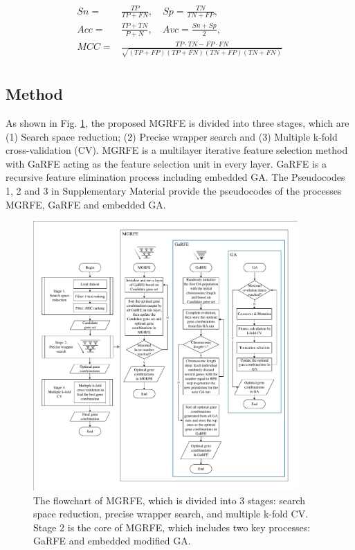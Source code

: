 \documentclass[10pt,journal,compsoc]{IEEEtran}
\begin{document}
	{\footnotesize
		\begin{equation}\label{eq:1}
		\begin{split}
		Sn = & \frac{TP}{TP+FN} ,\quad Sp = \frac{TN}{TN+FP}, \\
		Acc = & \frac{TP+TN}{P+N} ,\quad Avc = \frac{Sn+Sp}{2}, \\
		MCC = & \frac{TP \cdot TN-FP \cdot FN}{\sqrt{(TP+FP)(TP+FN)(TN+FP)(TN+FN)}}\\
		\end{split}
		\end{equation}
	}
	
	\subsection{Method}
	
	As shown in Fig. \ref {Fig:MGRFE_flowchart}, the proposed MGRFE is divided into three stages, which are (1) Search space reduction; (2) Precise wrapper search and (3) Multiple k-fold cross-validation (CV). MGRFE is a multilayer iterative feature selection method with GaRFE acting as the feature selection unit in every layer. GaRFE is a recursive feature elimination process including embedded GA. The Pseudocodes 1, 2 and 3 in Supplementary Material provide the pseudocodes of the processes MGRFE, GaRFE and embedded GA.
	
	\begin{figure}[t]
		\centering
		\includegraphics[width=0.9\textwidth]{pictures/MGRFE-flowchart.pdf}
		\caption{The flowchart of MGRFE, which is divided into 3 stages: search space reduction, precise wrapper search, and multiple k-fold CV. Stage 2 is the core of MGRFE, which includes two key processes: GaRFE and embedded modified GA.}
		\label{Fig:MGRFE_flowchart}
	\end{figure}
	
\end{document}
